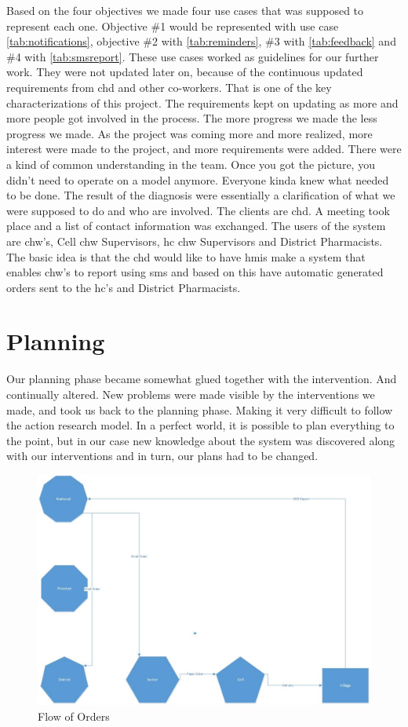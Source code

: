 Based on the four objectives we made four use cases that was supposed to represent each one. Objective \#1 would be represented with use case \ref{tab:notifications}, objective \#2 with \ref{tab:reminders}, \#3 with \ref{tab:feedback} and \#4 with \ref{tab:smsreport}. These use cases worked as guidelines for our further work. They were not updated later on, because of the continuous updated requirements from \gls{chd} and other co-workers. That is one of the key characterizations of this project. The requirements kept on updating as more and more people got involved in the process. The more progress we made the less progress we made. As the project was coming more and more realized, more interest were made to the project, and more requirements were added. There were a kind of common understanding in the team. Once you got the picture, you didn't need to operate on a model anymore. Everyone kinda knew what needed to be done. The result of the diagnosis were essentially a clarification of what we were supposed to do and who are involved. The clients are \gls{chd}. A meeting took place and a list of contact information was exchanged. The users of the system are \gls{chw}'s, Cell \gls{chw} Supervisors, \gls{hc} \gls{chw} Supervisors and District Pharmacists. The basic idea is that the \gls{chd} would like to have \gls{hmis} make a system that enables \gls{chw}'s to report using \gls{sms} and based on this have automatic generated orders sent to the \gls{hc}'s and District Pharmacists.

\section{Planning}

Our planning phase became somewhat glued together with the intervention. And continually altered. New problems were made visible by the interventions we made, and took us back to the planning phase. Making it very difficult to follow the action research model. In a perfect world, it is possible to plan everything to the point, but in our case new knowledge about the system was discovered along with our interventions and in turn, our plans had to be changed. 

\begin{figure}
\centering
\includegraphics[width=\textwidth]{case/img/orderFlow}
\caption{Flow of Orders}
\label{fig:chworder}
\end{figure}

